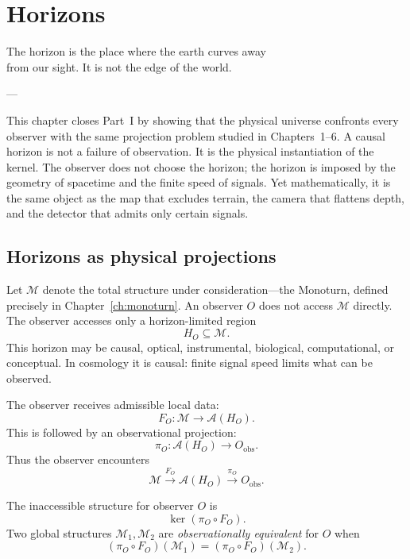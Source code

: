 
\chapter{Horizons}
\label{ch:horizons}

\epigraph{%
  The horizon is the place where the earth curves away\\
  from our sight. It is not the edge of the world.%
}{---}

\begin{WhyMatters}
  This chapter closes Part~I by showing that the physical
  universe confronts every observer with the same projection
  problem studied in Chapters~1--6.
  A causal horizon is not a failure of observation.
  It is the physical instantiation of the kernel.
  The observer does not choose the horizon; the horizon is
  imposed by the geometry of spacetime and the finite speed
  of signals.
  Yet mathematically, it is the same object as the map that
  excludes terrain, the camera that flattens depth, and the
  detector that admits only certain signals.
\end{WhyMatters}

\section{Horizons as physical projections}

Let $\mathcal{M}$ denote the total structure under
consideration---the Monoturn, defined precisely in
Chapter~\ref{ch:monoturn}.
An observer $O$ does not access $\mathcal{M}$ directly.
The observer accesses only a horizon-limited region
\[
  H_O \subseteq \mathcal{M}.
\]
This horizon may be causal, optical, instrumental, biological,
computational, or conceptual.
In cosmology it is causal: finite signal speed limits what can
be observed.

The observer receives admissible local data:
\[
  F_O : \mathcal{M} \to \mathcal{A}(H_O).
\]
This is followed by an observational projection:
\[
  \pi_O : \mathcal{A}(H_O) \to O_{\mathrm{obs}}.
\]
Thus the observer encounters
\[
  \mathcal{M}
  \xrightarrow{F_O}
  \mathcal{A}(H_O)
  \xrightarrow{\pi_O}
  O_{\mathrm{obs}}.
\]

\begin{definition}
  The inaccessible structure for observer $O$ is
  \[
    \ker(\pi_O \circ F_O).
  \]
  Two global structures $\mathcal{M}_1, \mathcal{M}_2$ are
  \emph{observationally equivalent} for $O$ when
  \[
    (\pi_O \circ F_O)(\mathcal{M}_1)
    = (\pi_O \circ F_O)(\mathcal{M}_2).
  \]
\end{definition}


